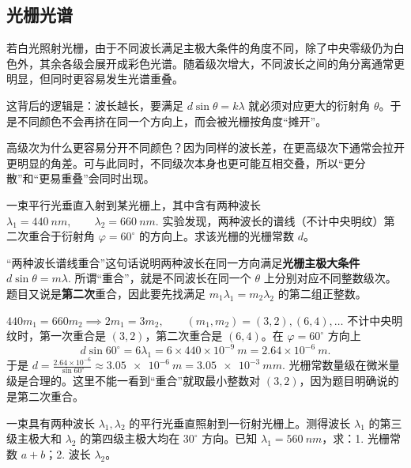 \documentclass[lang=cn,11pt]{elegantbook}
\begin{document}
\subsection{光栅光谱}

若白光照射光栅，由于不同波长满足主极大条件的角度不同，除了中央零级仍为白色外，其余各级会展开成彩色光谱。随着级次增大，不同波长之间的角分离通常更明显，但同时更容易发生光谱重叠。

这背后的逻辑是：波长越长，要满足
 \(d\sin\theta=k\lambda\) 
就必须对应更大的衍射角 \(\theta\)。于是不同颜色不会再挤在同一个方向上，而会被光栅按角度“摊开”。

\begin{note}
高级次为什么更容易分开不同颜色？因为同样的波长差，在更高级次下通常会拉开更明显的角差。可与此同时，不同级次本身也更可能互相交叠，所以“更分散”和“更易重叠”会同时出现。
\end{note}

\begin{exercise}[两种波长第二次重合时怎样反推光栅常数]
一束平行光垂直入射到某光栅上，其中含有两种波长
 \(\lambda_1=\SI{440}{nm},\qquad \lambda_2=\SI{660}{nm}.\) 
实验发现，两种波长的谱线（不计中央明纹）第二次重合于衍射角 \(\varphi=60^\circ\) 的方向上。求该光栅的光栅常数 \(d\)。
\end{exercise}

\begin{solution}
“两种波长谱线重合”这句话说明两种波长在同一方向满足\textbf{光栅主极大条件}
 \(d\sin\theta=m\lambda.\) 
所谓“重合”，就是不同波长在同一个 \(\theta\) 上分别对应不同整数级次。题目又说是\textbf{第二次}重合，因此要先找满足
 \(m_1\lambda_1=m_2\lambda_2\) 
的第二组正整数。

 \(440m_1=660m_2 \implies 2m_1=3m_2, \qquad (m_1,m_2)=(3,2),(6,4),\dots\) 
不计中央明纹时，第一次重合是 \((3,2)\)，第二次重合是 \((6,4)\)。在 \(\varphi=60^\circ\) 方向上
\[
d\sin 60^\circ=6\lambda_1=6\times 440\times 10^{-9}\ \si{m}=2.64\times10^{-6}\ \si{m}.
\]
于是
 \(d=\frac{2.64\times10^{-6}}{\sin 60^\circ} \approx \SI{3.05e-6}{m}=\SI{3.05e-3}{mm}.\) 
光栅常数量级在微米量级是合理的。这里不能一看到“重合”就取最小整数对 \((3,2)\)，因为题目明确说的是第二次重合。
\end{solution}

\begin{exercise}
一束具有两种波长 \(\lambda_1,\lambda_2\) 的平行光垂直照射到一衍射光栅上。测得波长 \(\lambda_1\) 的第三级主极大和 \(\lambda_2\) 的第四级主极大均在 \(30^\circ\) 方向。已知 \(\lambda_1=\SI{560}{nm}\)，求：1. 光栅常数 \(a+b\)；2. 波长 \(\lambda_2\)。
\end{exercise}
\end{document}

